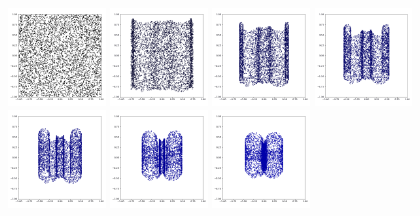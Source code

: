 \documentclass[lang=cn,11pt]{elegantpaper}
\begin{document}
\begin{figure}[hbt]
\centering
  \includegraphics[width=0.23\textwidth]{wings_1_1}
  \includegraphics[width=0.23\textwidth]{wings_1_2}
  \includegraphics[width=0.23\textwidth]{wings_1_3}
  \includegraphics[width=0.23\textwidth]{wings_1_4}\\
  \includegraphics[width=0.23\textwidth]{wings_1_5}
  \includegraphics[width=0.23\textwidth]{wings_1_6}
  \includegraphics[width=0.23\textwidth]{wings_1_7}

\end{figure}
\end{document}
